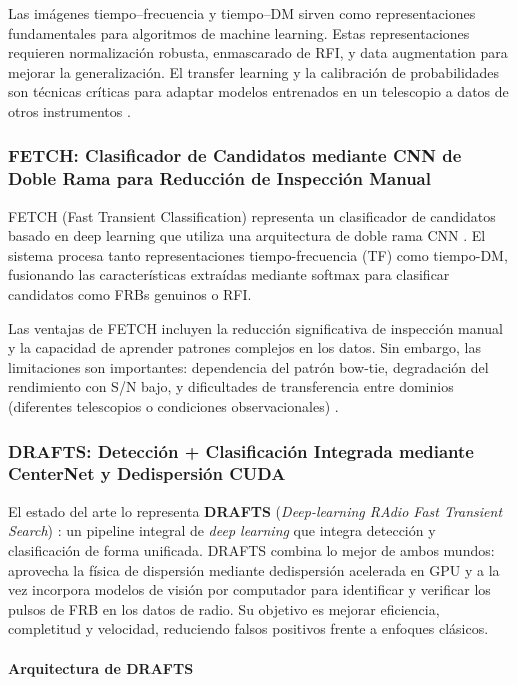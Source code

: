 Las imágenes tiempo–frecuencia y tiempo–DM sirven como representaciones fundamentales para algoritmos de machine learning. Estas representaciones requieren normalización robusta, enmascarado de RFI, y data augmentation para mejorar la generalización. El transfer learning y la calibración de probabilidades son técnicas críticas para adaptar modelos entrenados en un telescopio a datos de otros instrumentos \citep{Agarwal_2020}.

\subsubsection{FETCH: Clasificador de Candidatos mediante CNN de Doble Rama para Reducción de Inspección Manual}

FETCH (Fast Transient Classification) representa un clasificador de candidatos basado en deep learning que utiliza una arquitectura de doble rama CNN \citep{Agarwal_2020}. El sistema procesa tanto representaciones tiempo-frecuencia (TF) como tiempo-DM, fusionando las características extraídas mediante softmax para clasificar candidatos como FRBs genuinos o RFI.

Las ventajas de FETCH incluyen la reducción significativa de inspección manual y la capacidad de aprender patrones complejos en los datos. Sin embargo, las limitaciones son importantes: dependencia del patrón bow-tie, degradación del rendimiento con S/N bajo, y dificultades de transferencia entre dominios (diferentes telescopios o condiciones observacionales) \citep{Agarwal_2020}.

\subsubsection{DRAFTS: Detección + Clasificación Integrada mediante CenterNet y Dedispersión CUDA}

El estado del arte lo representa \textbf{DRAFTS} (\textit{Deep-learning RAdio Fast Transient Search}) \citep{zhang2024drafts}: un pipeline integral de \textit{deep learning} que integra detección y clasificación de forma unificada. DRAFTS combina lo mejor de ambos mundos: aprovecha la física de dispersión mediante dedispersión acelerada en GPU y a la vez incorpora modelos de visión por computador para identificar y verificar los pulsos de FRB en los datos de radio. Su objetivo es mejorar eficiencia, completitud y velocidad, reduciendo falsos positivos frente a enfoques clásicos.

\paragraph{Arquitectura de DRAFTS}

